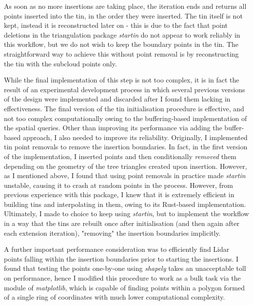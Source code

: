 As soon as no more insertions are taking place, the iteration ends and returns all points inserted into the \ac{tin}, in the order they were inserted. The \ac{tin} itself is not kept, instead it is reconstructed later on - this is due to the fact that point deletions in the triangulation package \textit{startin} do not appear to work reliably in this workflow, but we do not wish to keep the boundary points in the \ac{tin}. The straightforward way to achieve this without point removal is by reconstructing the \ac{tin} with the subcloud points only.

While the final implementation of this step is not too complex, it is in fact the result of an experimental development process in which several previous versions of the design were implemented and discarded after I found them lacking in effectiveness. The final version of the \ac{tin} initialisation procedure is effective, and not too complex computationally owing to the buffering-based implementation of the spatial queries. Other than improving its performance via adding the buffer-based approach, I also needed to improve its reliability. Originally, I implemented \ac{tin} point removals to remove the insertion boundaries. In fact, in the first version of the implementation, I inserted points and then conditionally \textit{removed} them depending on the geometry of the tree triangles created upon insertion. However, as I mentioned above, I found that using point removals in practice made \textit{startin} unstable, causing it to crash at random points in the process. However, from previous experience with this package, I knew that it is extremely efficient in building \ac{tin}s and interpolating in them, owing to its Rust-based implementation. Ultimately, I made to choice to keep using \textit{startin}, but to implement the workflow in a way that the \ac{tin}s are rebuilt once after initialisation (and then again after each extension iteration), "removing" the insertion boundaries implicitly.

A further important performance consideration was to efficiently find Lidar points falling within the insertion boundaries prior to starting the insertions. I found that testing the points one-by-one using \textit{shapely} takes an unacceptable toll on performance, hence I modified this procedure to work as a bulk task via the  module of \textit{matplotlib}, which is capable of finding points within a polygon formed of a single ring of coordinates with much lower computational complexity.

